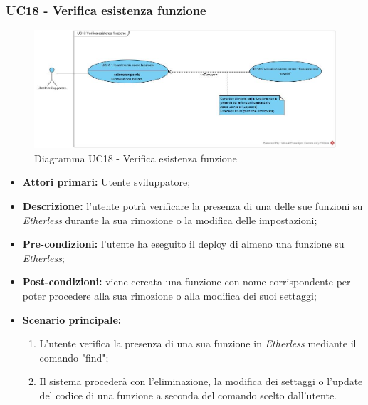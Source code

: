 \subsubsection{UC18 - Verifica esistenza funzione}
\begin{figure}[h]
	\centering
	\includegraphics[width=\linewidth]{res/img/UC18.jpg}
	\caption{Diagramma UC18 - Verifica esistenza funzione}
\end{figure}
\begin{itemize}
	\item \textbf{Attori primari:} Utente sviluppatore;
	\item \textbf{Descrizione:} l'utente potrà verificare la presenza di una delle sue funzioni su \textit{Etherless} durante la sua rimozione o la modifica delle impostazioni; 
	\item \textbf{Pre-condizioni:} l'utente ha eseguito il deploy di almeno una funzione su \textit{Etherless};
	\item \textbf{Post-condizioni:} viene cercata una funzione con nome corrispondente per poter procedere alla sua rimozione o alla modifica dei suoi settaggi;
	\item \textbf{Scenario principale:} 
	\begin{enumerate}
		\item L'utente verifica la presenza di una sua funzione in \textit{Etherless} mediante il comando "find";
		\item Il sistema procederà con l'eliminazione, la modifica dei settaggi o l'update del codice di una funzione a seconda del comando scelto dall'utente.
	\end{enumerate}
\end{itemize}